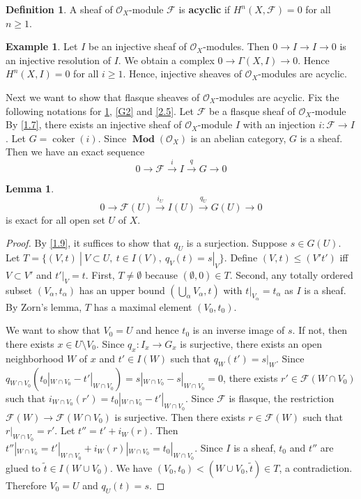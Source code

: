 \documentclass{amsart}
\numberwithin{equation}{section}
\theoremstyle{plain}
\theoremstyle{definition}
\newtheorem{lem}[equation]{Lemma}
\newtheorem{defn}[equation]{Definition}
\newtheorem{eg}[equation]{Example}
\DeclareMathOperator{\cok}{coker}
\DeclareMathOperator{\Mod}{\mathbf{Mod}}
\begin{document}
\begin{defn}\label{2.8}
	A sheaf of $ \mathcal O_X $-module  $ \mathscr F $ is \textbf{acyclic} if $ H^n(X, \mathscr F)=0 $ for all $ n\ge 1 $. 
\end{defn}

\begin{eg}\label{eg-inj}
	Let $ I $ be an injective sheaf of $ \mathcal O_X $-modules. 
	Then $ 0\to I\to I\to 0 $ is an injective resolution of $ I $. 
	We obtain a complex $ 0\to \Gamma(X,I)\to 0 $. 
	Hence $ H^n(X, I)=0 $ for all $ i\ge 1 $. Hence, {injective sheaves of $ \mathcal O_X $-modules are acyclic. }
\end{eg}

Next we want to show that flasque sheaves of $ \mathcal O_X $-modules are acyclic. 
Fix the following notations for \cref{G1}, \cref{G2} and \cref{2.5}. 
Let $ \mathscr F $ be a flasque sheaf of $ \mathcal O_X $-module
By \cref{1.7}, there exists an injective sheaf of $ \mathcal O_X $-module $ I $ with an injection $ i: \mathscr F\to I $. 
Let $ G =\cok( i) $. 
Since $ \Mod(\mathcal{O}_X) $ is an abelian category, $ G $ is a sheaf. 
Then we have an exact sequence \[0\to \mathscr F\xrightarrow{i} I\xrightarrow{q} G\to 0\]

\begin{lem}\label{G1}
	 \[0\to \mathscr F(U)\xrightarrow{i_U} I(U)\xrightarrow{q_U} G(U)\to 0\] is exact for all open set $ U $ of $ X $.
\end{lem}

\begin{proof}
	By \cref{1.9}, it suffices to show that $ q_U $ is a surjection. 
	Suppose $ s\in G(U) $. 
	Let $ T=\{(V,t)~|~V\subset U,~t\in I(V),~q_V(t)=s|_V\} $. 
	Define $ (V,t)\le (V't') $ iff $ V\subset V' $ and $ t'|_V=t $. 
	First, $ T\ne \emptyset $ because $ (\emptyset, 0)\in T $. 
	Second, any totally ordered subset $ (V_{\alpha}, t_{\alpha}) $ has an upper bound $ (\bigcup\limits_{\alpha}V_{\alpha}, t) $ with $ t|_{V_{\alpha}} =t_{\alpha}$ as $ I $ is a sheaf. 
	By Zorn's lemma, $ T $ has a maximal element $ (V_0, t_0) $. 
	
	We want to show that $ V_0=U $ and hence $ t_0 $ is an inverse image of $ s $. 
	If not, then there exists $ x\in U\setminus V_0 $. 
	Since $ q_x: I_x\to G_x $ is surjective, there exists an open neighborhood $ W $ of $ x $ and $ t'\in I(W) $ such that $ q_W(t')=s|_W $. 
	Since $ q_{W\cap V_0}(t_0|_{W\cap V_0}-t'|_{W\cap V_0})=s|_{W\cap V_0}-s|_{W\cap V_0}=0 $, there exists $ r'\in \mathscr F(W\cap V_0) $ such that $ i_{W\cap V_0}(r')=t_0|_{W\cap V_0}-t'|_{W\cap V_0} $. 
	Since $ \mathscr F $ is flasque, the restriction $ \mathscr F(W)\to \mathscr F(W\cap V_0) $ is surjective. 
	Then there exists $ r\in \mathscr F(W) $ such that $ r|_{W\cap V_0}=r' $. 
	Let $ t''=t'+i_W(r) $.
	Then $ t''|_{W\cap V_0}=t'|_{W\cap V_0}+i_W(r)|_{W\cap V_0}=t_0|_{W\cap V_0} $. 
	Since $ I $ is a sheaf, $ t_0 $ and $ t'' $ are glued to $ \widetilde{t}\in I(W\cup V_0) $. 
	We have $ (V_0,t_0)<(W\cup V_0, \widetilde{t})\in T $, a contradiction. 
	Therefore $ V_0=U $ and $ q_U(t)=s $. 
\end{proof}
\end{document}
